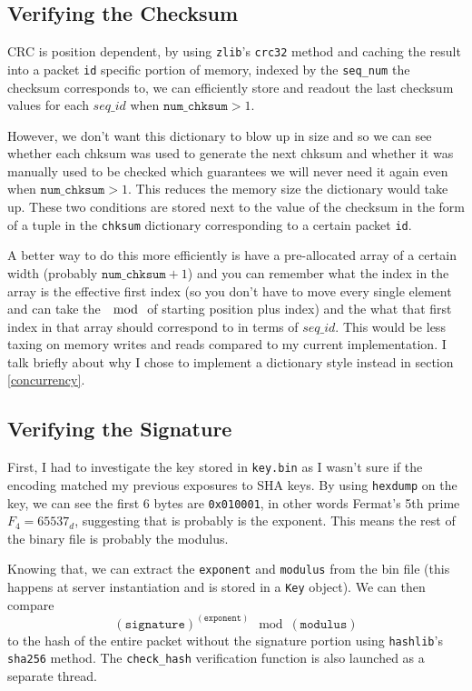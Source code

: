 \documentclass[acmtog,review]{acmart}
\begin{document}
\subsection{Verifying the Checksum}
\label{chksum}

CRC is position dependent, by using \texttt{zlib}'s \texttt{crc32} method and
caching the result into a packet \texttt{id} specific portion of memory,
indexed by the \texttt{seq\_num} the checksum corresponds to, we can
efficiently store and readout the last checksum values for each $seq\_id$ when 
$\texttt{num\_chksum} > 1$.

However, we don't want this dictionary to blow up in size and so
we can see whether each chksum was used to generate the next chksum
and whether it was manually used to be checked which guarantees
we will never need it again even when $\texttt{num\_chksum} > 1$.
This reduces the memory size the dictionary would take up.
These two conditions are stored next to the value of the checksum
in the form of a tuple in the \texttt{chksum} dictionary 
corresponding to a certain packet \texttt{id}.

A better way to do this more efficiently is have a pre-allocated
array of a certain width (probably $\texttt{num\_chksum}+1$)
and you can remember what the index in the array is the
effective first index (so you don't have to move every single element
and can take the $\mod$ of starting position plus index) and the 
what that first index in that array should correspond to in terms of 
$seq\_id$. This would be less taxing on memory writes and reads 
compared to my current implementation. I talk briefly about
why I chose to implement a dictionary style instead in section
\ref{concurrency}.

\subsection{Verifying the Signature}

First, I had to investigate the key stored in \texttt{key.bin}
as I wasn't sure if the encoding matched my previous exposures
to SHA keys. By using \texttt{hexdump} on the key, we can see the
first 6 bytes are \texttt{0x010001}, in other words Fermat's 5th 
prime $F_4 = 65537_d$, suggesting that is probably is the exponent.
This means the rest of the binary file is probably the modulus.

Knowing that, we can extract the \texttt{exponent} and \texttt{modulus} 
from the bin file (this happens at server instantiation and is stored
in a \texttt{Key} object). We can then compare 
$$(\texttt{signature}) ^ {(\texttt{exponent})}
\mod (\texttt{modulus})$$ to the hash of the entire packet without
the signature portion using \texttt{hashlib}'s 
\texttt{sha256} method. The \texttt{check\_hash} verification function
is also launched as a separate thread.
\end{document}
